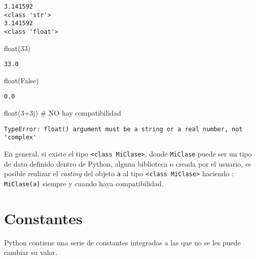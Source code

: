 \documentclass[
  letterpaper,
  DIV=11,
  numbers=noendperiod]{scrreprt}
\newenvironment{Shaded}{\begin{snugshade}}{\end{snugshade}}
\newcommand{\BuiltInTok}[1]{\textcolor[rgb]{0.00,0.23,0.31}{#1}}
\newcommand{\CommentTok}[1]{\textcolor[rgb]{0.37,0.37,0.37}{#1}}
\newcommand{\DecValTok}[1]{\textcolor[rgb]{0.68,0.00,0.00}{#1}}
\newcommand{\NormalTok}[1]{\textcolor[rgb]{0.00,0.23,0.31}{#1}}
\newcommand{\OperatorTok}[1]{\textcolor[rgb]{0.37,0.37,0.37}{#1}}
\newcommand{\OtherTok}[1]{\textcolor[rgb]{0.00,0.23,0.31}{#1}}
\newcommand{\VariableTok}[1]{\textcolor[rgb]{0.07,0.07,0.07}{#1}}
\begin{document}
\begin{verbatim}
3.141592
<class 'str'>
3.141592
<class 'float'>
\end{verbatim}

\begin{Shaded}
\begin{Highlighting}[]
\BuiltInTok{float}\NormalTok{(}\DecValTok{33}\NormalTok{)}
\end{Highlighting}
\end{Shaded}

\begin{verbatim}
33.0
\end{verbatim}

\begin{Shaded}
\begin{Highlighting}[]
\BuiltInTok{float}\NormalTok{(}\VariableTok{False}\NormalTok{)}
\end{Highlighting}
\end{Shaded}

\begin{verbatim}
0.0
\end{verbatim}

\begin{Shaded}
\begin{Highlighting}[]
\BuiltInTok{float}\NormalTok{(}\DecValTok{3}\OperatorTok{+}\OtherTok{3j}\NormalTok{) }\CommentTok{\# NO hay compatibilidad}
\end{Highlighting}
\end{Shaded}

\begin{verbatim}
TypeError: float() argument must be a string or a real number, not 'complex'
\end{verbatim}

En general, si existe el tipo
\texttt{\textless{}class\ \textquotesingle{}MiClase\textquotesingle{}\textgreater{}},
donde \texttt{MiClase} puede ser un tipo de dato definido dentro de
Python, alguna biblioteca o creada por el usuario, es posible realizar
el \emph{casting} del objeto \texttt{a} al tipo
\texttt{\textless{}class\ \textquotesingle{}MiClase\textquotesingle{}\textgreater{}}
haciendo : \texttt{MiClase(a)} siempre y cuando haya compatibilidad.

\section{Constantes}\label{constantes}

Python contiene una serie de constantes integradas a las que no se les
puede cambiar su valor.
\end{document}
